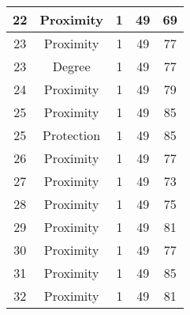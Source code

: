 \documentclass[results.tex]{subfiles}
\begin{document}
\begin{center}
\begin{tabular}{| c || c | c | c | c |}
            \hline
            22                      & Proximity                    & 1                      & 49                      & 69                   \\
            \hline
            23                      & Proximity                    & 1                      & 49                      & 77                   \\
            \hline
            23                      & Degree                       & 1                      & 49                      & 77                   \\
            \hline
            24                      & Proximity                    & 1                      & 49                      & 79                   \\
            \hline
            25                      & Proximity                    & 1                      & 49                      & 85                   \\
            \hline
            25                      & Protection                   & 1                      & 49                      & 85                   \\
            \hline
            26                      & Proximity                    & 1                      & 49                      & 77                   \\
            \hline
            27                      & Proximity                    & 1                      & 49                      & 73                   \\
            \hline
            28                      & Proximity                    & 1                      & 49                      & 75                   \\
            \hline
            29                      & Proximity                    & 1                      & 49                      & 81                   \\
            \hline
            30                      & Proximity                    & 1                      & 49                      & 77                   \\
            \hline
            31                      & Proximity                    & 1                      & 49                      & 85                   \\
            \hline
            32                      & Proximity                    & 1                      & 49                      & 81                   \\

\end{tabular}
\end{center}
\end{document}
